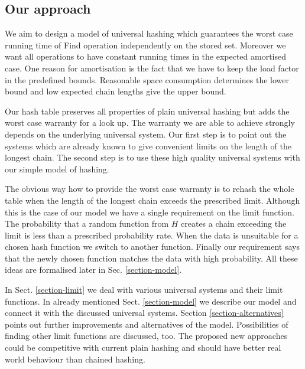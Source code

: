 \subsection{Our approach}
We aim to design a model of universal hashing which guarantees the worst case running time of Find operation independently on the stored set. Moreover we want all operations to have constant running times in the expected amortised case. One reason for amortisation is the fact that we have to keep the load factor in the predefined bounds. Reasonable space consumption determines the lower bound and low expected chain lengths give the upper bound.

Our hash table preserves all properties of plain universal hashing but adds the worst case warranty for a look up. The warranty we are able to achieve strongly depends on the underlying universal system. Our first step is to point out the systems which are already known to give convenient limits on the length of the longest chain. The second step is to use these high quality universal systems with our simple model of hashing.

The obvious way how to provide the worst case warranty is to rehash the whole table when the length of the longest chain exceeds the prescribed limit. Although this is the case of our model we have a single requirement on the limit function. The probability that a random function from $H$ creates a chain exceeding the limit is less than a prescribed probability rate. When the data is unsuitable for a chosen hash function we switch to another function. Finally our requirement says that the newly chosen function matches the data with high probability. All these ideas are formalised later in Sec. \ref{section-model}.

In Sect. \ref{section-limit} we deal with various universal systems and their limit functions. In already mentioned Sect. \ref{section-model} we describe our model and connect it with the discussed universal systems. Section \ref{section-alternatives} points out further improvements and alternatives of the model. Possibilities of finding other limit functions are discussed, too. The proposed new approaches could be competitive with current plain hashing and should have better real world behaviour than chained hashing.
